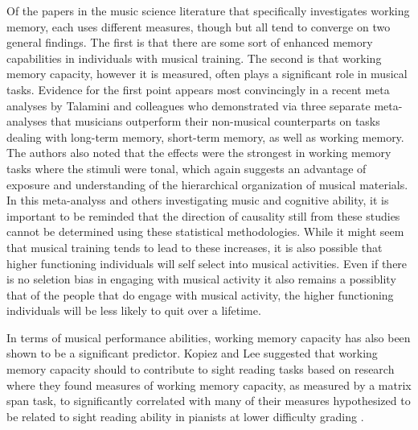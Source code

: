 \documentclass[]{book}
\begin{document}
Of the papers in the music science literature that specifically investigates working memory, each uses different measures, though but all tend to converge on two general findings.
The first is that there are some sort of enhanced memory capabilities in individuals with musical training.
The second is that working memory capacity, however it is measured, often plays a significant role in musical tasks.
Evidence for the first point appears most convincingly in a recent meta analyses by Talamini and colleagues \citep{talaminiMusiciansHaveBetter2017} who demonstrated via three separate meta-analyses that musicians outperform their non-musical counterparts on tasks dealing with long-term memory, short-term memory, as well as working memory.
The authors also noted that the effects were the strongest in working memory tasks where the stimuli were tonal, which again suggests an advantage of exposure and understanding of the hierarchical organization of musical materials.
In this meta-analyss and others investigating music and cognitive ability, it is important to be reminded that the direction of causality still from these studies cannot be determined using these statistical methodologies.
While it might seem that musical training tends to lead to these increases, it is also possible that higher functioning individuals will self select into musical activities.
Even if there is no seletion bias in engaging with musical activity it also remains a possiblity that of the people that do engage with musical activity, the higher functioning individuals will be less likely to quit over a lifetime.

In terms of musical performance abilities, working memory capacity has also been shown to be a significant predictor.
Kopiez and Lee suggested that working memory capacity should to contribute to sight reading tasks based on research where they found measures of working memory capacity, as measured by a matrix span task, to significantly correlated with many of their measures hypothesized to be related to sight reading ability in pianists at lower difficulty grading \citep{kopiezDynamicModelSkills2006, kopiezGeneralModelSkills2008}.
\end{document}
